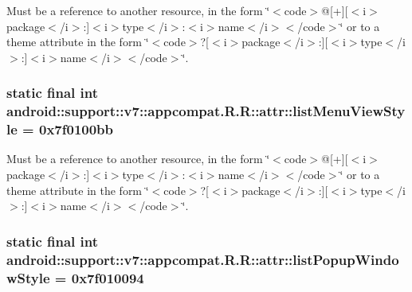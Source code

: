 Must be a reference to another resource, in the form \char`\"{}$<$code$>$@\mbox{[}+\mbox{]}\mbox{[}$<$i$>$package$<$/i$>$:\mbox{]}$<$i$>$type$<$/i$>$:$<$i$>$name$<$/i$>$$<$/code$>$\char`\"{} or to a theme attribute in the form \char`\"{}$<$code$>$?\mbox{[}$<$i$>$package$<$/i$>$:\mbox{]}\mbox{[}$<$i$>$type$<$/i$>$:\mbox{]}$<$i$>$name$<$/i$>$$<$/code$>$\char`\"{}. \hypertarget{classandroid_1_1support_1_1v7_1_1appcompat_1_1_r_1_1attr_87c592d14ff7a2d9c501d19a795c3004}{
\subsubsection[{listMenuViewStyle}]{\setlength{\rightskip}{0pt plus 5cm}static final int android::support::v7::appcompat.R.R::attr::listMenuViewStyle = 0x7f0100bb}}
\label{classandroid_1_1support_1_1v7_1_1appcompat_1_1_r_1_1attr_87c592d14ff7a2d9c501d19a795c3004}


Must be a reference to another resource, in the form \char`\"{}$<$code$>$@\mbox{[}+\mbox{]}\mbox{[}$<$i$>$package$<$/i$>$:\mbox{]}$<$i$>$type$<$/i$>$:$<$i$>$name$<$/i$>$$<$/code$>$\char`\"{} or to a theme attribute in the form \char`\"{}$<$code$>$?\mbox{[}$<$i$>$package$<$/i$>$:\mbox{]}\mbox{[}$<$i$>$type$<$/i$>$:\mbox{]}$<$i$>$name$<$/i$>$$<$/code$>$\char`\"{}. \hypertarget{classandroid_1_1support_1_1v7_1_1appcompat_1_1_r_1_1attr_b6828cebd0625e00b32de4a909de2ac2}{
\subsubsection[{listPopupWindowStyle}]{\setlength{\rightskip}{0pt plus 5cm}static final int android::support::v7::appcompat.R.R::attr::listPopupWindowStyle = 0x7f010094}}
\label{classandroid_1_1support_1_1v7_1_1appcompat_1_1_r_1_1attr_b6828cebd0625e00b32de4a909de2ac2}


